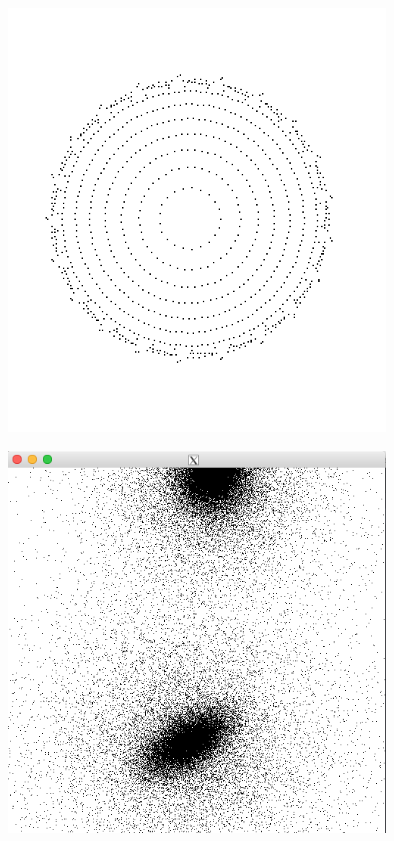 \documentclass[11pt, a4paper]{article}
\makeatletter
\newcommand\fcaption{\def\@captype{figure}\caption}
\makeatother
\begin{document}
\begin{center}
    \includegraphics[width=10cm]{ss1}
    \fcaption{Screen shot for test1}\label{ss1}
\end{center}

\begin{center}
    \includegraphics[width=10cm]{ss2}
    \fcaption{Screen shot for test2}\label{ss2}
\end{center}
\end{document}
